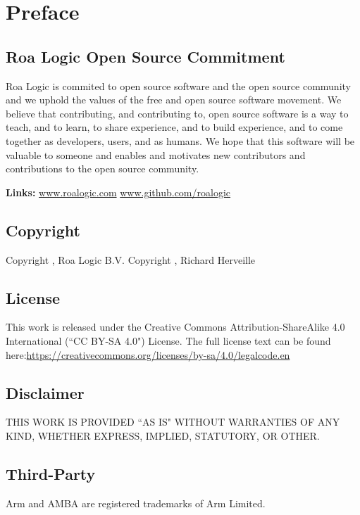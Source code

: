 \chapter{Preface}\label{preface}

\section{Roa Logic Open Source Commitment}
Roa Logic is commited to open source software and the open source community and we uphold the values of the free and open source software movement.
We believe that contributing, and contributing to, open source software is a way to teach, and to learn, to share experience, and to build experience, and to come together as developers, users, and as humans.
We hope that this software will be valuable to someone and enables and motivates new contributors and contributions to the open source community.

\noindent\textbf{Links:}\newline
\url{www.roalogic.com}\newline
\url{www.github.com/roalogic}


\section{Copyright}

Copyright , Roa Logic B.V.\newline
Copyright , Richard Herveille


\section{License}

This work is released under the Creative Commons Attribution-ShareAlike 4.0 International (``CC BY-SA 4.0") License.
The full license text can be found here:\newline \url{https://creativecommons.org/licenses/by-sa/4.0/legalcode.en}


\section{Disclaimer}

THIS WORK IS PROVIDED ``AS IS" WITHOUT WARRANTIES OF ANY KIND, WHETHER EXPRESS, IMPLIED, STATUTORY, OR OTHER.


\section{Third-Party}

Arm and AMBA are registered trademarks of Arm Limited.

